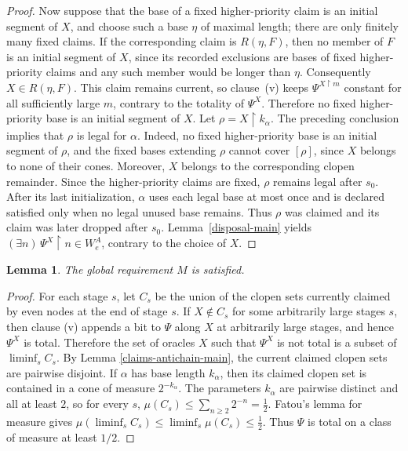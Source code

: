 \documentclass[11pt]{amsart}
\newtheorem{lemma}[theorem]{Lemma}
\begin{document}
\begin{proof}
Now suppose that the base of a fixed higher-priority claim is an initial
segment of $X$, and choose such a base $\eta$ of maximal length; there are only
finitely many fixed claims.  If the corresponding claim is $R(\eta,F)$, then
no member of $F$ is an initial segment of $X$, since its recorded exclusions
are bases of fixed higher-priority claims and any such member would be longer
than $\eta$.
Consequently $X\in R(\eta,F)$.  This claim remains current, so clause~(v)
keeps $\Psi^{X\upharpoonright m}$ constant for all sufficiently large $m$,
contrary to the totality of $\Psi^X$.  Therefore no fixed higher-priority base
is an initial segment of $X$.
Let $\rho=X\upharpoonright k_\alpha$.  The preceding conclusion implies that
$\rho$ is legal for $\alpha$.  Indeed, no fixed higher-priority base is an
initial segment of $\rho$, and the fixed bases extending $\rho$ cannot cover
$[\rho]$, since $X$ belongs to none of their cones.  Moreover, $X$ belongs to
the corresponding clopen remainder.  Since the higher-priority claims are
fixed, $\rho$ remains legal after $s_0$.  After its last initialization,
$\alpha$ uses each legal base at most once and is declared satisfied only when
no legal unused base remains.  Thus $\rho$ was claimed and its claim was later
dropped after $s_0$.  Lemma~\ref{disposal-main} yields
$(\exists n)\,\Psi^X\upharpoonright n\in W_e^A$, contrary to the choice of $X$.
\end{proof}

\begin{lemma}\label{15}
The global requirement $M$ is satisfied.
\end{lemma}

\begin{proof}
For each stage $s$, let $C_s$ be the union of the clopen sets currently claimed
by even nodes at the end of stage $s$.  If $X\notin C_s$ for some arbitrarily large
stages $s$, then clause (v) appends a bit to $\Psi$ along $X$ at arbitrarily large
stages, and hence $\Psi^X$ is total.  Therefore the set of oracles $X$ such that $\Psi^X$ is not total is a subset of $\liminf_s C_s$.
By Lemma \ref{claims-antichain-main}, the current claimed clopen sets are
pairwise disjoint.  If $\alpha$ has base length $k_\alpha$, then its claimed
clopen set is contained in a cone of measure $2^{-k_\alpha}$.  The parameters
$k_\alpha$ are pairwise distinct and all at least $2$, so for every $s$, $\mu(C_s)\leq\sum_{n\geq2}2^{-n}=\frac12$.
Fatou's lemma for measure gives $\mu(\liminf_s C_s)
      \leq \liminf_s \mu(C_s)
      \leq \frac12$.
Thus $\Psi$ is total on a class of measure at least $1/2$.
\end{proof}
\end{document}
